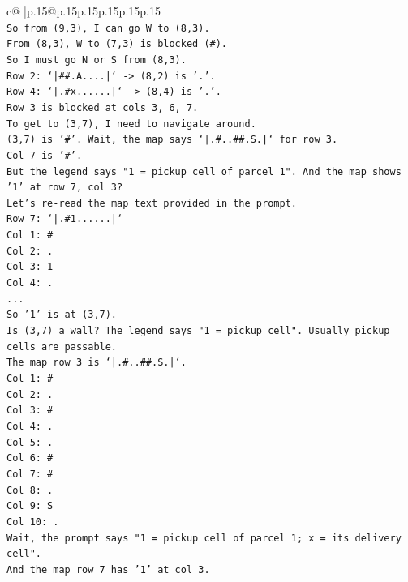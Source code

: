 \documentclass{article}
\begin{document}
{\begin{supertabular}{c@{$\;$}|p{.15\linewidth}@{}p{.15\linewidth}p{.15\linewidth}p{.15\linewidth}p{.15\linewidth}p{.15\linewidth}}
{{{\\ 
\texttt{So from (9,3), I can go W to (8,3).} \\
\texttt{From (8,3), W to (7,3) is blocked (\#).} \\
\texttt{So I must go N or S from (8,3).} \\
\texttt{Row 2: `|\#\#.A....|` {-}> (8,2) is '.'.} \\
\texttt{Row 4: `|.\#x......|` {-}> (8,4) is '.'.} \\
\texttt{Row 3 is blocked at cols 3, 6, 7.} \\
\texttt{To get to (3,7), I need to navigate around.} \\
\texttt{(3,7) is '\#'. Wait, the map says `|.\#..\#\#.S.|` for row 3.} \\
\texttt{Col 7 is '\#'.} \\
\texttt{But the legend says "1 = pickup cell of parcel 1". And the map shows '1' at row 7, col 3?} \\
\texttt{Let's re{-}read the map text provided in the prompt.} \\
\texttt{Row 7: `|.\#1......|`} \\
\texttt{Col 1: \#} \\
\texttt{Col 2: .} \\
\texttt{Col 3: 1} \\
\texttt{Col 4: .} \\
\texttt{...} \\
\texttt{So '1' is at (3,7).} \\
\texttt{Is (3,7) a wall? The legend says "1 = pickup cell". Usually pickup cells are passable.} \\
\texttt{The map row 3 is `|.\#..\#\#.S.|`.} \\
\texttt{Col 1: \#} \\
\texttt{Col 2: .} \\
\texttt{Col 3: \#} \\
\texttt{Col 4: .} \\
\texttt{Col 5: .} \\
\texttt{Col 6: \#} \\
\texttt{Col 7: \#} \\
\texttt{Col 8: .} \\
\texttt{Col 9: S} \\
\texttt{Col 10: .} \\
\texttt{Wait, the prompt says "1 = pickup cell of parcel 1; x = its delivery cell".} \\
\texttt{And the map row 7 has '1' at col 3.} \\
}}}
\end{supertabular}}
\end{document}

